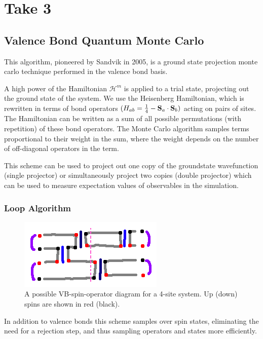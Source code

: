 \documentclass[prb,aps,twocolumn,floatfix,amsmath,amssymb,superscriptaddress,tightenlines]{revtex4}
\begin{document}
\section{Take 3}

\subsection{Valence Bond Quantum Monte Carlo}

This algorithm, pioneered by Sandvik \cite{papers} in 2005, is a ground state projection monte carlo technique performed in the valence bond basis.

A high power of the Hamiltonian $\mathcal{H}^m$ 
is applied to a trial state, projecting out the ground state of the system.
We use the Heisenberg Hamiltonian, which is rewritten in terms of bond operators $(H_{ab} = \tfrac{1}{4} - {\bf S}_a \cdot {\bf S}_b)$ acting on pairs of sites.
The Hamiltonian can be written as a sum of all possible {\color{red}permutations (with repetition)} of these bond operators.
The Monte Carlo algorithm samples terms proportional to their weight in the sum, where the weight depends on the number of off-diagonal operators in the term.

This scheme can be used to project out one copy of the groundstate wavefunction (single projector) or simultaneously project two copies (double projector) which can be used to measure expectation values of observables in the simulation. 

\subsubsection{Loop Algorithm}

\begin{figure} {
\includegraphics[width=3 in]{loopalg.png} \caption{ A possible VB-spin-operator diagram for a 4-site system.
Up (down) spins are shown in red (black). 
\label{loop1} }
} \end{figure}

In addition to valence bonds this scheme samples over spin states, eliminating the need for a rejection step, and thus sampling operators and states more efficiently.
\end{document}
